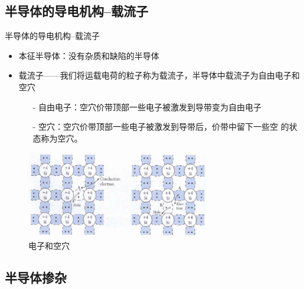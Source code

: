 \documentclass[trans]{beamer} %
\begin{document}
 \subsection{半导体的导电机构--载流子}
 \begin{frame}{半导体的导电机构--载流子}
    
    \begin{itemize}
        \item 本征半导体：没有杂质和缺陷的半导体
        \item 载流子——我们将运载电荷的粒子称为载流子，半导体中载流子为自由电子和空穴
            \begin{itemize}
             \item[-] 自由电子：空穴价带顶部一些电子被激发到导带变为自由电子
             \item[-]空穴：空穴价带顶部一些电子被激发到导带后，价带中留下一些空
的状态称为空穴。
                
            \end{itemize}
    \end{itemize}
    \begin{figure}[htbp] 
    \centering\includegraphics[height=1.5in]{source/ch2/fg216.png} 
    \caption{电子和空穴}
    \end{figure}  
   
 
 \end{frame}

 \subsection{半导体掺杂} 
 
\end{document}
